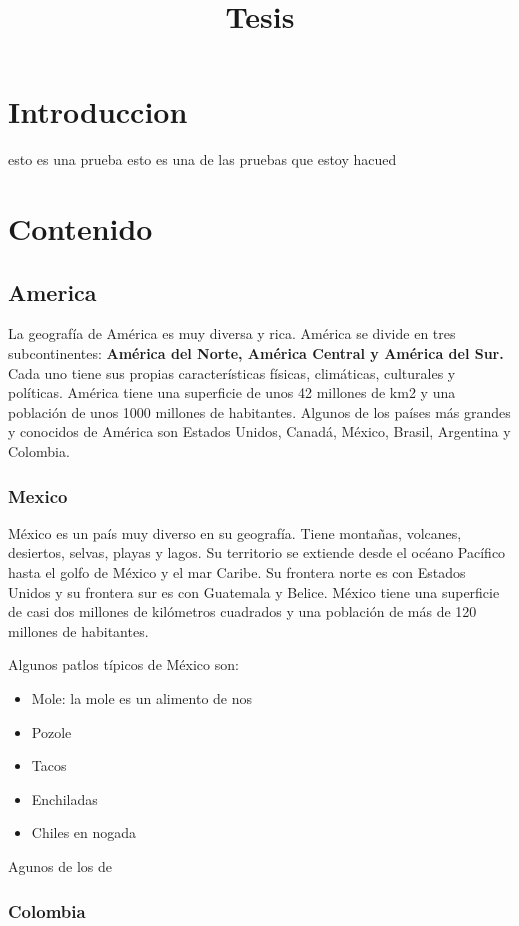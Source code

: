 \documentclass{article}
\title{Tesis}
\begin{document}
\maketitle
\section{Introduccion}
esto es una prueba esto es una de las pruebas que estoy hacued
\section{Contenido}
\subsection*{America}

La geografía de América es muy diversa y rica. América se divide en tres subcontinentes: \textbf{América del Norte, América Central y América del Sur.} Cada uno tiene sus propias características físicas, climáticas, culturales y políticas. América tiene una superficie de unos 42 millones de km2 y una población de unos 1000 millones de habitantes. Algunos de los países más grandes y conocidos de América son Estados Unidos, Canadá, México, Brasil, Argentina y Colombia.

\subsubsection*{Mexico}

México es un país muy diverso en su geografía. Tiene montañas, volcanes, desiertos, selvas, playas y lagos. Su territorio se extiende desde el océano Pacífico hasta el golfo de México y el mar Caribe. Su frontera norte es con Estados Unidos y su frontera sur es con Guatemala y Belice. México tiene una superficie de casi dos millones de kilómetros cuadrados y una población de más de 120 millones de habitantes.

Algunos patlos típicos de México son:
\begin{itemize}
	\item Mole: la mole es un alimento de nos
	\item Pozole
	\item Tacos
	\item Enchiladas
	\item Chiles en nogada
\end{itemize}

Agunos de los de
\subsubsection*{Colombia}
\end{document}
